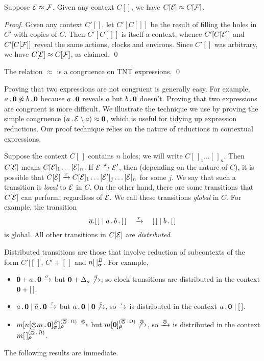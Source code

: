 \documentclass[orivec,envcountsame]{llncs}
\newcommand{\Eq}{\approx}
\newcommand{\NotEq}{\not\approx}
\newcommand{\Does}[1]{\xderives{#1}}
\begin{document}
\begin{proposition}
\label{prop:context-substitution} 
Suppose $\expr \Eq \exprb$. Given any context $C[]$, we have $C[\expr]
\Eq C[\exprb]$.
\end{proposition}
\begin{proof}
Given any context $C'[]$, let $C'[C[]]$ be the result of filling the
holes in $C'$ with copies of $C$. Then $C'[C[]]$ is itself a context,
whence $C'[C[\text{$\mathcal{E}$}]]$ and $C'[C[\text{$\mathcal{F}$}]]$ reveal the same actions,
clocks and environs. Since $C'[]$ was arbitrary, we have $C[\expr] \Eq
C[\exprb]$, as claimed.
\qed \end{proof}

\begin{theorem}
The relation $\Eq$ is a congruence on TNT expressions. \qed
\end{theorem}



Proving that two expressions are not congruent is generally easy. For
example, $a\pref\nil \NotEq b\pref\nil$ because $a\,.\,\textbf{0}$ reveals $a$
but $b\,.\,\textbf{0}$ doesn't. Proving that two expressions are congruent is
more difficult. We illustrate the technique we use by proving the simple
congruence $\left(a\pref\expr \res{a}\right) \Eq \nil$, which is useful
for tidying up expression reductions. Our proof technique relies on the
nature of reductions in contextual expressions.

Suppose the context $C[\,]$ contains $n$ holes; we will write
$C[\,]_1\dots[\,]_n$. Then $C[\text{$\mathcal{E}$}]$ means $C[\text{$\mathcal{E}$}]_1\dots[\text{$\mathcal{E}$}]_n$. If
$\expr \Does{x} \expr'$, then (depending on the nature of $C$), it is possible
that $C[\expr] \Does{x} C[\expr]_1\dots[\expr']_j\dots[\expr]_n$ for some $j$.
We say that such a transition is \emph{local} to $\text{$\mathcal{E}$}$ in $C$. On the other
hand, there are some transitions that $C[\text{$\mathcal{E}$}]$ can perform, regardless of
$\text{$\mathcal{E}$}$. We call these transitions \emph{global} in $C$. For example, the
transition \[ \out{a}.[\,] \mid a \pref b \pref [\,] \quad\Does{\tau}\quad [\,]
\mid b \pref [\,] \] is global. All other transitions in $C[\text{$\mathcal{E}$}]$ are
\emph{distributed}.

Distributed transitions are those that involve reduction of subcontexts of the
form $C'|[\,]$, $C' + [\,]$ and $\locv{n}{\,}{B}{\vec{\sigma}}$. For example,

\begin{itemize}
\item
    $\nil + a\pref\nil \Does{\sigma}$ but $\nil + \Delta_\sigma
     \not\Does{\sigma}$, so clock transitions are distributed in the
     context $\textbf{0} + [\,]$.
\item
    $a\pref\nil \mid \out{a}\pref\nil \Does{\tau}$ but $a\pref\nil \mid
     \nil \not\Does{\tau}$, so $\Does{\tau}$ is distributed in the
     context $a\,.\,\textbf{0} \mid [\,]$.
\item
    $\locv{m}{ \locv{n}{\tntout{m}\pref\nil}{B}{\vec{\sigma}}}%
     {(\bout\pref\Omega)}{\vec{\rho}} \Does{\tout}$ but
    $\locv{m}{ \nil }{(\bout\pref\Omega)}{\vec{\rho}} \not\Does{\tout}$,
     so $\Does{\tout}$ is distributed in the context $\locv{m}{\,}%
     {(\bout\pref\Omega)}{\vec{\rho}}$.
\end{itemize}
The following results are immediate.
\end{document}
